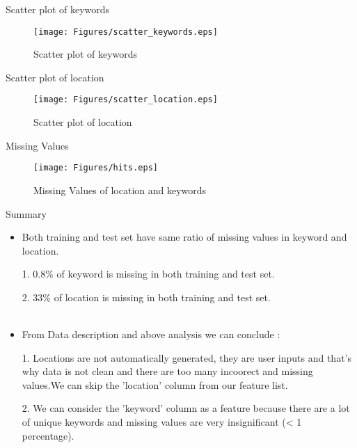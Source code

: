 \documentclass[
 size=12pt,
 paper=smartboard, %
 mode=present, %
 display=slides, %
 style=tuliplab,  %
 pauseslide,
 fleqn,leqno,clock]{powerdot}
\begin{document}
\begin{slide}{Scatter plot of keywords}
  \begin{figure}[htbp]
    \centering
      \texttt{[image: Figures/scatter\_keywords.eps]}
    \caption{Scatter plot of keywords}
  \end{figure}
\end{slide}

\begin{slide}{Scatter plot of location}
  \begin{figure}[htbp]
	\centering
	\texttt{[image: Figures/scatter\_location.eps]}
	\caption{Scatter plot of location}
  \end{figure}
\end{slide}


\begin{slide}{Missing Values}
  \begin{figure}
    \centering
    \texttt{[image: Figures/hits.eps]}
    \caption{Missing Values of location and keywords}
  \end{figure}
\end{slide}

\begin{slide}{Summary}
  \begin{itemize}
	\item<1->
	Both training and test set have same ratio of missing values in keyword and location.
	\item[1.]
	0.8\% of keyword is missing in both training and test set.
	\item[2.]
	33\% of location is missing in both training and test set.
	~\\
	~\\
	\item<1->
	From Data description and above analysis we can conclude :
	\item[1.]
	Locations are not automatically generated, they are user inputs and that's why data is not clean and there are too many incoorect and missing values.We can skip the 'location' column from our feature list.
	\item[2.]
	We can consider the 'keyword' column as a feature because there are a lot of unique keywords and missing values are very insignificant (< 1 percentage).
\end{itemize}
\end{slide}
\end{document}
